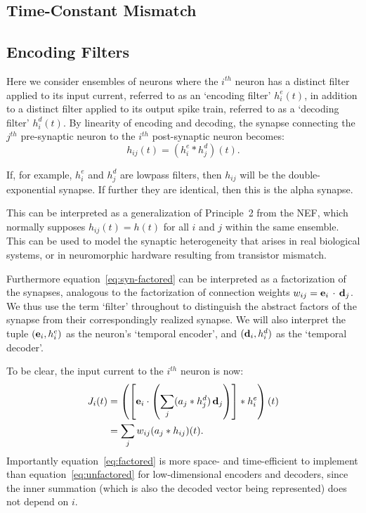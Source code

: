 \subsection{Time-Constant Mismatch}
\label{sec:mismatch}

\subsection{Encoding Filters}

Here we consider ensembles of neurons where the $i^{th}$ neuron has a distinct filter applied to its input current, referred to as an `encoding filter' $h^e_i(t)$, in addition to a distinct filter applied to its output spike train, referred to as a `decoding filter' $h^d_i(t)$. 
By linearity of encoding and decoding, the synapse connecting the $j^{th}$ pre-synaptic neuron to the $i^{th}$ post-synaptic neuron becomes:
\begin{equation} \label{eq:syn-factored}
h_{ij}(t) = (h^e_i \ast h^d_j)(t) .
\end{equation}

If, for example, $h^e_i$ and $h^d_j$ are lowpass filters, then $h_{ij}$ will be the double-exponential synapse. If further  they are identical, then this is the alpha synapse.

This can be interpreted as a generalization of Principle~2 from the NEF, which normally supposes $h_{ij}(t) = h(t)$ for all $i$ and $j$ within the same ensemble.
This can be used to model the synaptic heterogeneity that arises in real biological systems, or in neuromorphic hardware resulting from transistor mismatch. 

Furthermore equation~\ref{eq:syn-factored} can be interpreted as a factorization of the synapses, analogous to the factorization of connection weights \mbox{$w_{ij} = \mathbf{e}_i \, \cdot \, \mathbf{d}_j$}.
We thus use the term `filter' throughout to distinguish the abstract factors of the synapse from their correspondingly realized synapse.
We will also interpret the tuple $(\mathbf{e}_i, h^e_i)$ as the neuron's `temporal encoder', and $(\mathbf{d}_i, h^d_i)$ as the `temporal decoder'.

To be clear, the input current to the $i^{th}$ neuron is now:
\begin{align}
J_i(t) &= \left( \left[ \mathbf{e}_i \cdot \left( \sum_j ( a_j \ast h^d_j) \, \mathbf{d}_j \right) \right] \ast h^e_i \right)(t) \label{eq:factored} \\
       &= \sum_j w_{ij} (a_j \ast h_{ij})(t) . \label{eq:unfactored}
\end{align}
Importantly equation~\ref{eq:factored} is more space- and time-efficient to implement than equation~\ref{eq:unfactored} for low-dimensional encoders and decoders, since the inner summation (which is also the decoded vector being represented) does not depend on $i$.

